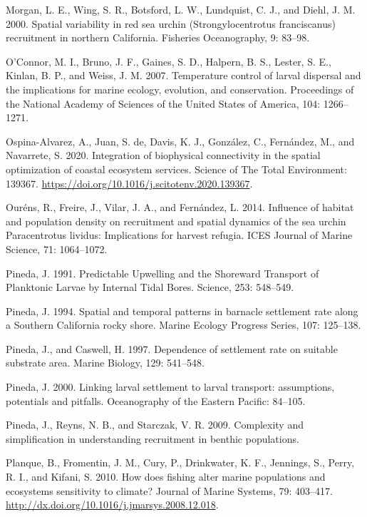 \documentclass[12pt]{article}
\begin{document}
\leavevmode\hypertarget{ref-Morgan2000}{}%
Morgan, L. E., Wing, S. R., Botsford, L. W., Lundquist, C. J., and
Diehl, J. M. 2000. Spatial variability in red sea urchin
(Strongylocentrotus franciscanus) recruitment in northern California.
Fisheries Oceanography, 9: 83--98.

\leavevmode\hypertarget{ref-OConnor2007}{}%
O'Connor, M. I., Bruno, J. F., Gaines, S. D., Halpern, B. S., Lester, S.
E., Kinlan, B. P., and Weiss, J. M. 2007. Temperature control of larval
dispersal and the implications for marine ecology, evolution, and
conservation. Proceedings of the National Academy of Sciences of the
United States of America, 104: 1266--1271.

\leavevmode\hypertarget{ref-Ospina-Alvarez2020}{}%
Ospina-Alvarez, A., Juan, S. de, Davis, K. J., González, C., Fernández,
M., and Navarrete, S. 2020. Integration of biophysical connectivity in
the spatial optimization of coastal ecosystem services. Science of The
Total Environment: 139367.
\url{https://doi.org/10.1016/j.scitotenv.2020.139367}.

\leavevmode\hypertarget{ref-Ourens2014}{}%
Ouréns, R., Freire, J., Vilar, J. A., and Fernández, L. 2014. Influence
of habitat and population density on recruitment and spatial dynamics of
the sea urchin Paracentrotus lividus: Implications for harvest refugia.
ICES Journal of Marine Science, 71: 1064--1072.

\leavevmode\hypertarget{ref-Pineda1991}{}%
Pineda, J. 1991. Predictable Upwelling and the Shoreward Transport of
Planktonic Larvae by Internal Tidal Bores. Science, 253: 548--549.

\leavevmode\hypertarget{ref-Pineda1994}{}%
Pineda, J. 1994. Spatial and temporal patterns in barnacle settlement
rate along a Southern California rocky shore. Marine Ecology Progress
Series, 107: 125--138.

\leavevmode\hypertarget{ref-Pineda1997}{}%
Pineda, J., and Caswell, H. 1997. Dependence of settlement rate on
suitable substrate area. Marine Biology, 129: 541--548.

\leavevmode\hypertarget{ref-Pineda2000}{}%
Pineda, J. 2000. Linking larval settlement to larval transport:
assumptions, potentials and pitfalls. Oceanography of the Eastern
Pacific: 84--105.

\leavevmode\hypertarget{ref-Pineda2009}{}%
Pineda, J., Reyns, N. B., and Starczak, V. R. 2009. Complexity and
simplification in understanding recruitment in benthic populations.

\leavevmode\hypertarget{ref-Planque2010}{}%
Planque, B., Fromentin, J. M., Cury, P., Drinkwater, K. F., Jennings,
S., Perry, R. I., and Kifani, S. 2010. How does fishing alter marine
populations and ecosystems sensitivity to climate? Journal of Marine
Systems, 79: 403--417.
\url{http://dx.doi.org/10.1016/j.jmarsys.2008.12.018}.
\end{document}
